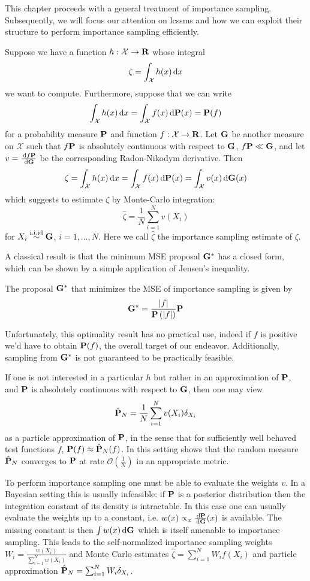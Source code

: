 This chapter proceeds with a general treatment of importance sampling. Subsequently, we will focus our attention on \glspl{lcssm} and how we can exploit their structure to perform importance sampling efficiently. 

Suppose we have a function $h: \mathcal X \to \R$ whose integral $$\zeta = \int_{\mathcal X} h(x) \d x$$ we want to compute.
Furthermore, suppose that we can write
$$
    \int_{\mathcal X} h(x) \d x = \int_{\mathcal X} f(x) \d \P(x) = \P (f)
$$
for a probability measure $\P$ and function $f: \mathcal X \to \R$.
Let $\G$ be another measure on $\mathcal X$ such that $f\P$ is absolutely continuous with respect to $\G$, $f\P \ll \G$, and let $v = \frac{\d f\P}{\d\G}$ be the corresponding Radon-Nikodym derivative. Then
$$
    \zeta = \int_{\mathcal X} h(x) \d x = \int_{\mathcal X} f(x) \d \P(x) = \int_{\mathcal X} v(x)\d\G(x)
$$
which suggests to estimate $\zeta$ by Monte-Carlo integration: $$\hat \zeta = \frac 1 N \sum_{i=1}^{N} v(X_i)$$ for $X_i \iid \G$, $i = 1, \dots, N$. Here we call $\hat \zeta$ the importance sampling estimate of $\zeta$.

A classical result is that the minimum MSE proposal $\G^\ast$ has a closed form, which can be shown by a simple application of Jensen's inequality. 
\begin{proposition}
    \label{prop:minimum_MSE_IS}
    The proposal $\G^{\ast}$ that minimizes the MSE of importance sampling is given by
    $$
    \G^{\ast}  = \frac{\lvert f \rvert}{\P\left(\lvert f \rvert \right)} \P
    $$
\end{proposition}
Unfortunately, this optimality result has no practical use, indeed if $f$ is positive we'd have to obtain $\P(f)$, the overall target of our endeavor. Additionally, sampling from $\G^{\ast}$ is not guaranteed to be practically feasible. 

If one is not interested in a particular $h$ but rather in an approximation of $\P$, and $\P$ is absolutely continuous with respect to $\G$, then one may view $$\hat \P_N = \frac{1}{N} \sum_{i = 1}^{N} v(X_i) \delta_{X_i}$$ as a particle approximation of $\P$, in the sense that for sufficiently well behaved test functions $f$, $\P (f) \approx \hat\P_{N}(f)$. In this setting \cite{Agapiou2017Importance} shows that the random measure $\hat \P_N$ converges to $\P$ at rate $\mathcal O\left(\frac 1 N\right)$ in an appropriate metric.

To perform importance sampling one must be able to evaluate the weights $v$. In a Bayesian setting this is usually infeasible: if $\P$ is a posterior distribution then the integration constant of its density is intractable.
In this case one can usually evaluate the weights up to a constant, i.e. $w(x) \propto_x \frac{\d \P}{\d \G}(x)$ is available. The missing constant is then $\int w(x) \d \G$ which is itself amenable to importance sampling.
This leads to the self-normalized importance sampling weights $W_i = \frac{w(X_i)}{\sum_{i = 1}^N w(X_i)}$ and Monte Carlo estimates $\hat \zeta = \sum_{i = 1}^{N} W_i f(X_i)$ and particle approximation $\hat \P_N = \sum_{i = 1}^{N} W_i \delta_{X_i}$.


